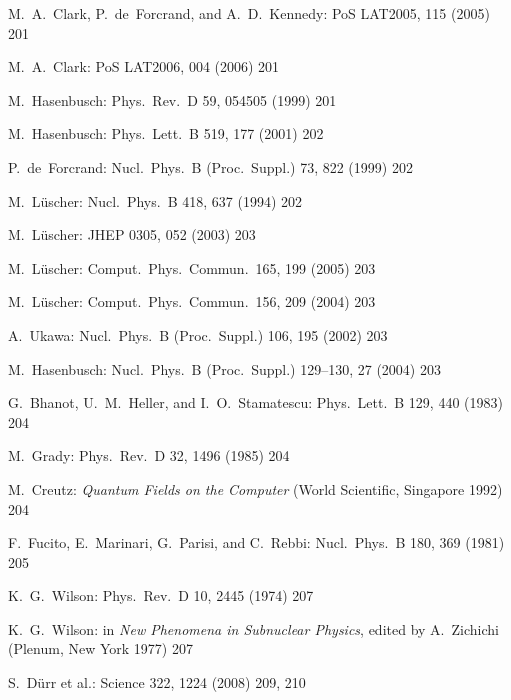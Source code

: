 \begin{enumerate}[label={[\arabic*]}]
  \item M.~A.~Clark, P.~de~Forcrand, and A.~D.~Kennedy: PoS LAT2005, 115
        (2005) 201
  \item M.~A.~Clark: PoS LAT2006, 004 (2006) 201
  \item M.~Hasenbusch: Phys.\ Rev.\ D 59, 054505 (1999) 201
  \item M.~Hasenbusch: Phys.\ Lett.\ B 519, 177 (2001) 202
  \item P.~de~Forcrand: Nucl.\ Phys.\ B (Proc.\ Suppl.) 73, 822 (1999) 202
  \item M.~L\"uscher: Nucl.\ Phys.\ B 418, 637 (1994) 202
  \item M.~L\"uscher: JHEP 0305, 052 (2003) 203
  \item M.~L\"uscher: Comput.\ Phys.\ Commun.\ 165, 199 (2005) 203
  \item M.~L\"uscher: Comput.\ Phys.\ Commun.\ 156, 209 (2004) 203
  \item A.~Ukawa: Nucl.\ Phys.\ B (Proc.\ Suppl.) 106, 195 (2002) 203
  \item M.~Hasenbusch: Nucl.\ Phys.\ B (Proc.\ Suppl.) 129--130, 27 (2004) 203
  \item G.~Bhanot, U.~M.~Heller, and I.~O.~Stamatescu: Phys.\ Lett.\ B 129,
        440 (1983) 204
  \item M.~Grady: Phys.\ Rev.\ D 32, 1496 (1985) 204
  \item M.~Creutz: \emph{Quantum Fields on the Computer} (World Scientific,
        Singapore 1992) 204
  \item F.~Fucito, E.~Marinari, G.~Parisi, and C.~Rebbi: Nucl.\ Phys.\ B 180,
        369 (1981) 205
  \item K.~G.~Wilson: Phys.\ Rev.\ D 10, 2445 (1974) 207
  \item K.~G.~Wilson: in \emph{New Phenomena in Subnuclear Physics}, edited by
        A.~Zichichi (Plenum, New York 1977) 207
  \item S.~D\"urr et al.: Science 322, 1224 (2008) 209, 210
\end{enumerate}
